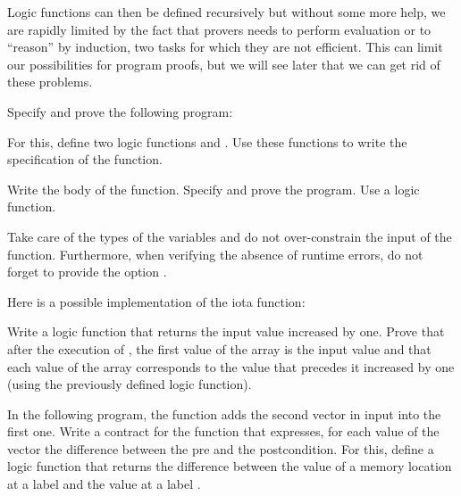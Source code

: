 Logic functions can then be defined recursively but without some more
help, we are rapidly limited by the fact that provers needs to
perform evaluation or to ``reason'' by induction, two tasks for which
they are not efficient. This can limit our possibilities for program
proofs, but we will see later that we can get rid of these problems.







Specify and prove the following program:






For this, define two logic functions  and .
Use these functions to write the specification of the function.





Write the body of the  function. Specify and prove the
program. Use a  logic function.




Take care of the types of the variables and do not over-constrain the input of
the function. Furthermore, when verifying the absence of runtime errors, do not
forget to provide the option .




Here is a possible implementation of the iota function:




Write a logic function that returns the input value increased by one. Prove
that after the execution of , the first value of the array is
the input value and that each value of the array corresponds to the value that
precedes it increased by one (using the previously defined logic function).






In the following program, the  function adds the second
vector in input into the first one. Write a contract for the function
 that expresses, for each value of the vector
 the difference between the pre and the postcondition. For this,
define a logic function  that returns the difference between
the value of a memory location at a label  and the value at a
label .


